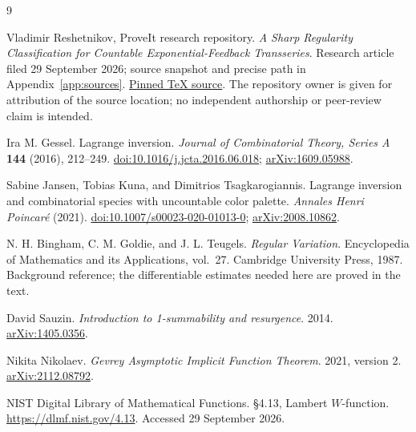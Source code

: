 \documentclass[11pt,a4paper]{article}
\numberwithin{equation}{section}
\theoremstyle{definition}
\theoremstyle{remark}
\begin{document}
\clearpage
{}
{}
\begin{thebibliography}{9}

Vladimir Reshetnikov, ProveIt research repository.
\emph{A Sharp Regularity Classification for Countable
Exponential-Feedback Transseries}. Research article filed 29 September
2026; source snapshot and precise path in Appendix~\ref{app:sources}.
\href{https://github.com/VladimirReshetnikov/ProveIt/blob/04473354a0f3edff2d6c365caf26170ca6b88735/Analysis/Transseries/docs/series-and-transseries/Exponential_Feedback_Regularity_Classification/article.tex}{Pinned TeX source}.
The repository owner is given for attribution of the source location;
no independent authorship or peer-review claim is intended.

Ira M. Gessel.
Lagrange inversion.
\emph{Journal of Combinatorial Theory, Series A} \textbf{144}
(2016), 212--249.
\href{https://doi.org/10.1016/j.jcta.2016.06.018}{doi:10.1016/j.jcta.2016.06.018};
\href{https://arxiv.org/abs/1609.05988}{arXiv:1609.05988}.

Sabine Jansen, Tobias Kuna, and Dimitrios Tsagkarogiannis.
Lagrange inversion and combinatorial species with uncountable color
palette.
\emph{Annales Henri Poincar\'e} (2021).
\href{https://doi.org/10.1007/s00023-020-01013-0}{doi:10.1007/s00023-020-01013-0};
\href{https://arxiv.org/abs/2008.10862}{arXiv:2008.10862}.

N. H. Bingham, C. M. Goldie, and J. L. Teugels.
\emph{Regular Variation}.
Encyclopedia of Mathematics and its Applications, vol.~27.
Cambridge University Press, 1987.
Background reference; the differentiable estimates needed here are
proved in the text.

David Sauzin.
\emph{Introduction to 1-summability and resurgence}.
2014.
\href{https://arxiv.org/abs/1405.0356}{arXiv:1405.0356}.

Nikita Nikolaev.
\emph{Gevrey Asymptotic Implicit Function Theorem}.
2021, version 2.
\href{https://arxiv.org/abs/2112.08792}{arXiv:2112.08792}.

NIST Digital Library of Mathematical Functions.
\S4.13, Lambert $W$-function.
\url{https://dlmf.nist.gov/4.13}.
Accessed 29 September 2026.

\end{thebibliography}
\end{document}
